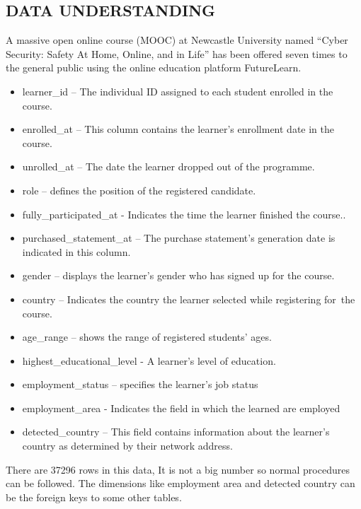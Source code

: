\documentclass[
]{article}
\providecommand{\tightlist}{%
  \setlength{\itemsep}{0pt}\setlength{\parskip}{0pt}}
\begin{document}
\hypertarget{data-understanding-1}{%
\subsection{DATA UNDERSTANDING}\label{data-understanding-1}}

A massive open online course (MOOC) at Newcastle University named
``Cyber Security: Safety At Home, Online, and in Life'' has been offered
seven times to the general public using the online education platform
FutureLearn.

\begin{itemize}
\tightlist
\item
  learner\_id -- The individual ID assigned to each student enrolled in
  the course.
\item
  enrolled\_at -- This column contains the learner's enrollment date in
  the course.
\item
  unrolled\_at -- The date the learner dropped out of the programme.
\item
  role -- defines the position of the registered candidate.
\item
  fully\_participated\_at - Indicates the time the learner finished the
  course..
\item
  purchased\_statement\_at -- The purchase statement's generation date
  is indicated in this column.
\item
  gender -- displays the learner's gender who has signed up for the
  course.
\item
  country -- Indicates the country the learner selected while
  registering for~the course.
\item
  age\_range -- shows the range of registered students' ages.
\item
  highest\_educational\_level - A learner's level of education.
\item
  employment\_status -- specifies the learner's job status
\item
  employment\_area - Indicates the field in which the learned are
  employed
\item
  detected\_country -- This field contains information about the
  learner's country as determined by their network address.
\end{itemize}

There are 37296 rows in this data, It is not a big number so normal
procedures can be followed. The dimensions like employment area and
detected country can be the foreign keys to some other tables.
\end{document}
